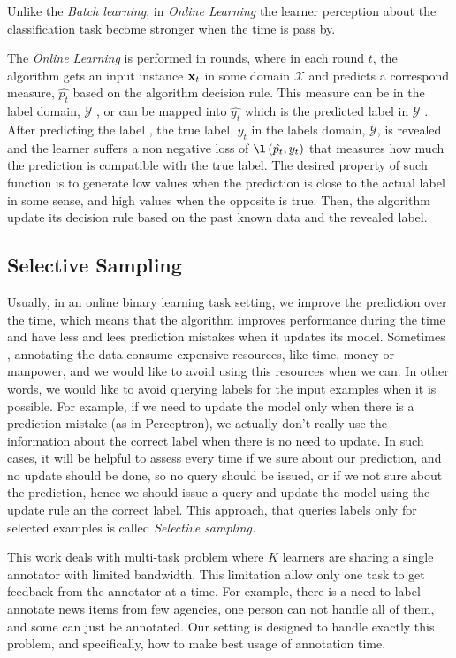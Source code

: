 Unlike the \textit{Batch learning}, in \textit{Online Learning} 
 the learner perception about the classification task become stronger when the time is pass by.

The \textit{Online Learning} is performed in rounds, where in each round $t$, 
the algorithm gets an input instance $\mathbf{x}_{t}$ in some domain $\mathcal{X}$  and predicts a  correspond 
measure, $\hat{p_t}$ based on the algorithm decision  rule. This measure can be in the label domain, 
$\mathcal{Y}$ , or can be mapped into $\hat{y_t}$ which is the predicted label in $\mathcal{Y}$ .   
After predicting the label , the true label, $y_t$ in the labels domain, $\mathcal{Y}$, is revealed 
and the learner suffers a non negative loss of $\l\paren{\hat{p_t},y_t}$ that measures how much the 
prediction is compatible with the true label. The desired property of such function is to generate low 
values when the prediction is close to the actual label in some sense, and high values when the opposite 
is true. Then, the algorithm update its decision rule based on the past known data and the revealed label. 

\subsection{Selective Sampling}

Usually, in an   online binary learning task setting,  we improve the prediction over the time, 
which means that the algorithm improves performance during the time and have less and lees prediction
 mistakes when it updates its model. 
Sometimes , annotating the data consume expensive resources, like time, money or manpower, 
and we would like to avoid using this resources when we can. In other words, we would like 
to avoid querying labels for the input examples when it is possible. For example, if we need to update the 
model only when there is a prediction mistake (as in Perceptron), we actually don't really 
use the information about the correct label when there is no need to update. In such cases, 
it will be helpful to assess every time if we sure about our prediction, and no update should be done, 
so no query should be issued, or if we not sure about the prediction, hence we should issue a 
query and update the model using the update rule an the correct label. 
This approach, that queries labels only for selected examples is called \textit{Selective sampling.}

This work deals with multi-task problem where $K$ learners are sharing a single annotator with limited bandwidth. This limitation allow only one task to get feedback from the annotator at a time. For example, there is a need to label annotate news items from few agencies, one person can not handle all of them, and some can just be annotated. Our setting is designed to handle exactly this problem, and specifically, how to make best usage of annotation time. 

